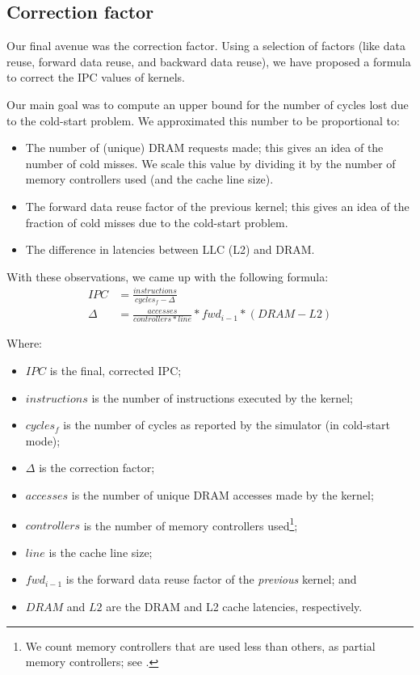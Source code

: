 \subsection{Correction factor}\label{subsec:correction-factor}
Our final avenue was the correction factor.
Using a selection of factors (like data reuse, forward data reuse, and backward data reuse), we have proposed a formula to correct the IPC values of kernels.

Our main goal was to compute an upper bound for the number of cycles lost due to the cold-start problem.
We approximated this number to be proportional to:
\begin{itemize}
    \item The number of (unique) DRAM requests made; this gives an idea of the number of cold misses.
    We scale this value by dividing it by the number of memory controllers used (and the cache line size).
    \item The forward data reuse factor of the previous kernel; this gives an idea of the fraction of cold misses due to the cold-start problem.
    \item The difference in latencies between LLC (L2) and DRAM\@.
\end{itemize}

With these observations, we came up with the following formula:
\begin{align}
    IPC &= \frac{instructions}{cycles_f - \Delta} \\
    \Delta &= \frac{accesses}{controllers * line} * fwd_{i-1} * (DRAM - L2)
\end{align}

Where:
\begin{itemize}
    \item $IPC$ is the final, corrected IPC;
    \item $instructions$ is the number of instructions executed by the kernel;
    \item $cycles_f$ is the number of cycles as reported by the simulator (in cold-start mode);
    \item $\Delta$ is the correction factor;
    \item $accesses$ is the number of unique DRAM accesses made by the kernel;
    \item $controllers$ is the number of memory controllers used\footnote{We count memory controllers that are used less than others, as partial memory controllers; see .};
    \item $line$ is the cache line size;
    \item $fwd_{i-1}$ is the forward data reuse factor of the \textit{previous} kernel; and
    \item $DRAM$ and $L2$ are the DRAM and L2 cache latencies, respectively.
\end{itemize}

